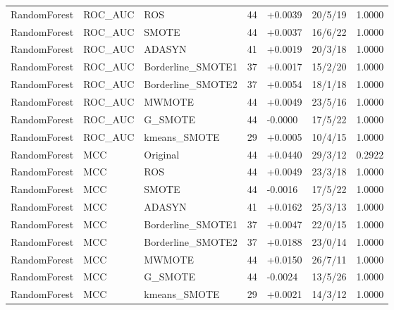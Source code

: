 \documentclass[10pt,a4paper]{article}
\begin{document}
\begin{longtable}{lllllrr}
RandomForest & ROC\_AUC & ROS & 44 & +0.0039 & 20/5/19 & 1.0000 \\
RandomForest & ROC\_AUC & SMOTE & 44 & +0.0037 & 16/6/22 & 1.0000 \\
RandomForest & ROC\_AUC & ADASYN & 41 & +0.0019 & 20/3/18 & 1.0000 \\
RandomForest & ROC\_AUC & Borderline\_SMOTE1 & 37 & +0.0017 & 15/2/20 & 1.0000 \\
RandomForest & ROC\_AUC & Borderline\_SMOTE2 & 37 & +0.0054 & 18/1/18 & 1.0000 \\
RandomForest & ROC\_AUC & MWMOTE & 44 & +0.0049 & 23/5/16 & 1.0000 \\
RandomForest & ROC\_AUC & G\_SMOTE & 44 & -0.0000 & 17/5/22 & 1.0000 \\
RandomForest & ROC\_AUC & kmeans\_SMOTE & 29 & +0.0005 & 10/4/15 & 1.0000 \\
RandomForest & MCC & Original & 44 & +0.0440 & 29/3/12 & 0.2922 \\
RandomForest & MCC & ROS & 44 & +0.0049 & 23/3/18 & 1.0000 \\
RandomForest & MCC & SMOTE & 44 & -0.0016 & 17/5/22 & 1.0000 \\
RandomForest & MCC & ADASYN & 41 & +0.0162 & 25/3/13 & 1.0000 \\
RandomForest & MCC & Borderline\_SMOTE1 & 37 & +0.0047 & 22/0/15 & 1.0000 \\
RandomForest & MCC & Borderline\_SMOTE2 & 37 & +0.0188 & 23/0/14 & 1.0000 \\
RandomForest & MCC & MWMOTE & 44 & +0.0150 & 26/7/11 & 1.0000 \\
RandomForest & MCC & G\_SMOTE & 44 & -0.0024 & 13/5/26 & 1.0000 \\
RandomForest & MCC & kmeans\_SMOTE & 29 & +0.0021 & 14/3/12 & 1.0000 \\
\end{longtable}
\endgroup
\clearpage
\end{document}
